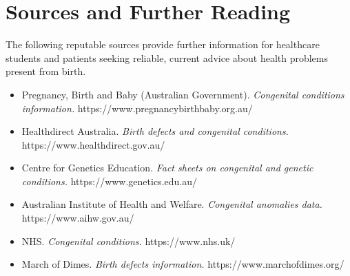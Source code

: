 \section*{Sources and Further Reading}
The following reputable sources provide further information for healthcare students and patients seeking reliable, current advice about health problems present from birth.

\begin{itemize}
    \item Pregnancy, Birth and Baby (Australian Government). \textit{Congenital conditions information.} https://www.pregnancybirthbaby.org.au/
    \item Healthdirect Australia. \textit{Birth defects and congenital conditions.} https://www.healthdirect.gov.au/
    \item Centre for Genetics Education. \textit{Fact sheets on congenital and genetic conditions.} https://www.genetics.edu.au/
    \item Australian Institute of Health and Welfare. \textit{Congenital anomalies data.} https://www.aihw.gov.au/
    \item NHS. \textit{Congenital conditions.} https://www.nhs.uk/
    \item March of Dimes. \textit{Birth defects information.} https://www.marchofdimes.org/
\end{itemize}

